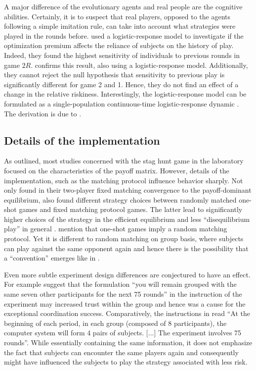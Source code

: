 A major difference of the evolutionary agents and 
real people are the cognitive abilities.
Certainly, it is to suspect that real players, opposed to the agents
following a simple imitation rule, can take into account what strategies 
were played in the rounds before.
\textcite{battalio_optimization_2001} used a logistic-response model to
investigate if the optimization premium affects the reliance of subjects
on the history of play. Indeed, they found the highest sensitivity of 
individuals to previous rounds in game $2R$.
\textcite{dubois_optimization_2012} confirms this result, also using 
a logistic-response model. Additionally, they cannot reject the null
hypothesis that sensitivity to previous play is significantly different for
game 2 and 1. Hence, they do not find an effect of a change in the
relative riskiness. Interestingly, the logistic-response model can be
formulated as a single-population continuous-time logistic-response dynamic
\parencite[752]{battalio_optimization_2001}. The derivation is due to
\textcite{fudenberg_theory_1998}. 


\subsection{Details of the implementation}
As outlined, most studies concerned with the stag hunt game in the 
laboratory focused on the characteristics of the payoff matrix. 
However, details of the implementation,
such as the matching protocol influence behavior sharply. Not only 
\textcite{van_huyck_tacit_1990} found in their two-player fixed matching
convergence to the payoff-dominant equilibrium, 
\textcite{clark_repetition_2001} also found different strategy 
choices between randomly matched one-shot games and fixed matching protocol 
games. The latter lead to significantly higher choices of the strategy 
in the efficient equilibrium and less ``disequilibrium play'' in general
\parencite[]{clark_repetition_2001}. 
\textcite{devetag_when_2007} mention that one-shot games imply a 
random matching protocol. Yet it is different to random matching on group
basis, where subjects can play against the same opponent again 
and hence there is the possibility that a ``convention'' emerges like in 
\textcite{rankin_strategic_2000}.

Even more subtle experiment design differences are conjectured to have an
effect. For example \textcite{devetag_when_2007} suggest that the formulation
``you will remain grouped with the same seven other participants for the next
75 rounds'' in the instruction of the \textcite{rankin_strategic_2000}  
experiment may increased trust within the group and hence was a 
cause for the exceptional coordination success. Comparatively, the 
instructions in \textcite{dubois_optimization_2012} read ``At the beginning
of each period, in each group (composed of 8 participants), the computer
system will form 4 pairs of subjects. [...] The experiment 
involves 75 rounds''\parencite[378]{dubois_optimization_2012}. 
While essentially containing the same information,
it does not emphasize the fact that subjects can encounter the same 
players again and consequently might have influenced the subjects to play
the strategy associated with less risk.

